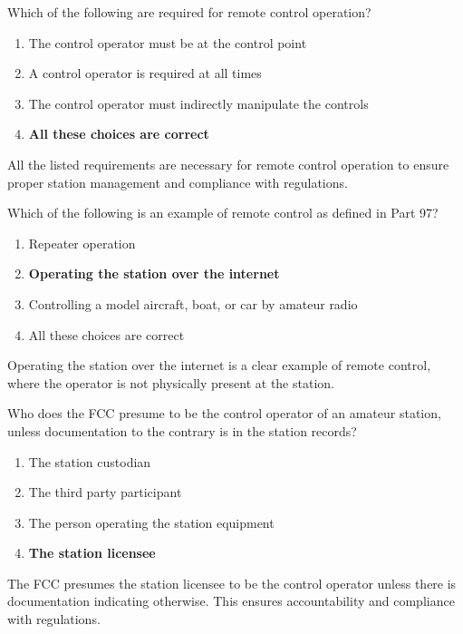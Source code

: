 
\begin{tcolorbox}[colback=gray!10!white,colframe=black!75!black,title={T1E09}]
    Which of the following are required for remote control operation?
    \begin{enumerate}[label=\Alph*),noitemsep]
        \item The control operator must be at the control point
        \item A control operator is required at all times
        \item The control operator must indirectly manipulate the controls
        \item \textbf{All these choices are correct}
    \end{enumerate}
\end{tcolorbox}
All the listed requirements are necessary for remote control operation to ensure proper station management and compliance with regulations.


\begin{tcolorbox}[colback=gray!10!white,colframe=black!75!black,title={T1E10}]
    Which of the following is an example of remote control as defined in Part 97?
    \begin{enumerate}[label=\Alph*),noitemsep]
        \item Repeater operation
        \item \textbf{Operating the station over the internet}
        \item Controlling a model aircraft, boat, or car by amateur radio
        \item All these choices are correct
    \end{enumerate}
\end{tcolorbox}
Operating the station over the internet is a clear example of remote control, where the operator is not physically present at the station.


\begin{tcolorbox}[colback=gray!10!white,colframe=black!75!black,title={T1E11}]
    Who does the FCC presume to be the control operator of an amateur station, unless documentation to the contrary is in the station records?
    \begin{enumerate}[label=\Alph*),noitemsep]
        \item The station custodian
        \item The third party participant
        \item The person operating the station equipment
        \item \textbf{The station licensee}
    \end{enumerate}
\end{tcolorbox}
The FCC presumes the station licensee to be the control operator unless there is documentation indicating otherwise. This ensures accountability and compliance with regulations.

